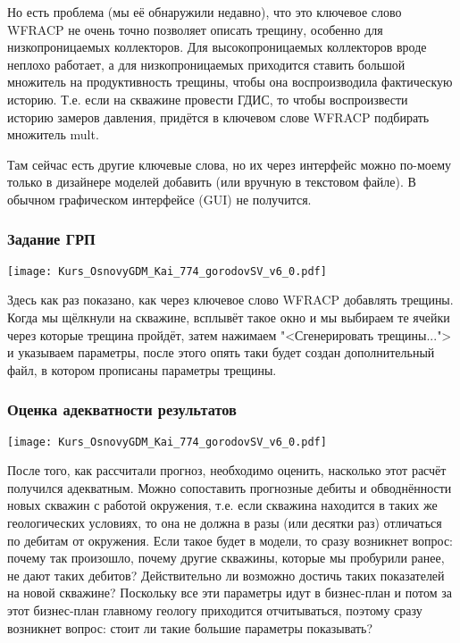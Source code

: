 \documentclass[main.tex]{subfiles}
\begin{document}
Но есть проблема (мы её обнаружили недавно), что это ключевое слово WFRACP не очень точно позволяет описать трещину, особенно для низкопроницаемых коллекторов.
Для высокопроницаемых коллекторов вроде неплохо работает, а для низкопроницаемых приходится ставить большой множитель на продуктивность трещины, чтобы она воспроизводила фактическую историю.
Т.е. если на скважине провести ГДИС, то чтобы воспроизвести историю замеров давления, придётся в ключевом слове WFRACP подбирать множитель mult.

Там сейчас есть другие ключевые слова, но их через интерфейс можно по-моему только в дизайнере моделей добавить (или вручную в текстовом файле).
В обычном графическом интерфейсе (GUI) не получится.

\subsubsection{Задание ГРП}

\texttt{[image: Kurs\_OsnovyGDM\_Kai\_774\_gorodovSV\_v6\_0.pdf]}

Здесь как раз показано, как через ключевое слово WFRACP добавлять трещины.
Когда мы щёлкнули на скважине, всплывёт такое окно и мы выбираем те ячейки через которые трещина пройдёт, затем нажимаем "<Сгенерировать трещины..."> и указываем параметры, после этого опять таки будет создан дополнительный файл, в котором прописаны параметры трещины.

\subsubsection{Оценка адекватности результатов}

\texttt{[image: Kurs\_OsnovyGDM\_Kai\_774\_gorodovSV\_v6\_0.pdf]}

После того, как рассчитали прогноз, необходимо оценить, насколько этот расчёт получился адекватным.
Можно сопоставить прогнозные дебиты и обводнённости новых скважин с работой окружения, т.е. если скважина находится в таких же геологических условиях, то она не должна в разы (или десятки раз) отличаться по дебитам от окружения.
Если такое будет в модели, то сразу возникнет вопрос: почему так произошло, почему другие скважины, которые мы пробурили ранее, не дают таких дебитов?
Действительно ли возможно достичь таких показателей на новой скважине?
Поскольку все эти параметры идут в бизнес-план и потом за этот бизнес-план главному геологу приходится отчитываться, поэтому сразу возникнет вопрос: стоит ли такие большие параметры показывать?
\end{document}
